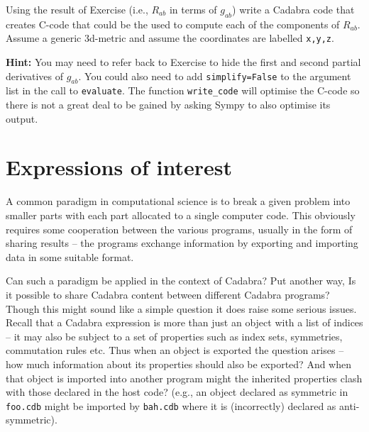 \documentclass[a4paper,12pt]{article}
\numberwithin{equation}{section}%
\begin{document}

\begin{Exercises}

   \begin{Exercise}
      Using the result of Exercise  (i.e., $R_{ab}$ in terms of $g_{ab}$)
      write a Cadabra code that creates C-code that could be the used to compute each of the
      components of $R_{ab}$. Assume a generic 3d-metric and assume the coordinates are
      labelled \verb|x,y,z|.

      {\bf Hint:} You may need to refer back to Exercise  to hide the first
                  and second partial derivatives of $g_{ab}$. You could also need to add
                  \verb|simplify=False| to the argument list in the call to \verb|evaluate|.
                  The function \verb|write_code| will optimise the C-code so there is not a
                  great deal to be gained by asking Sympy to also optimise its output.
   \end{Exercise}

\end{Exercises}

\clearpage

\section{Expressions of interest}
\label{sec:ex-08}
\ResetCounters



A common paradigm in computational science is to break a given problem into smaller parts
with each part allocated to a single computer code. This obviously requires some cooperation
between the various programs, usually in the form of sharing results -- the programs exchange
information by exporting and importing data in some suitable format.

Can such a paradigm be applied in the context of Cadabra? Put another way, Is it possible to
share Cadabra content between different Cadabra programs? Though this might sound like a
simple question it does raise some serious issues. Recall that a Cadabra expression is more
than just an object with a list of indices -- it may also be subject to a set of properties
such as index sets, symmetries, commutation rules etc. Thus when an object is exported the
question arises -- how much information about its properties should also be exported? And
when that object is imported into another program might the inherited properties clash with
those declared in the host code? (e.g., an object declared as symmetric in \verb|foo.cdb|
might be imported by \verb|bah.cdb| where it is (incorrectly) declared as
anti-symmetric).
\end{document}
